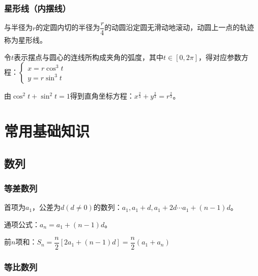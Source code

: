 \subsubsection{星形线（内摆线）}

\begin{minipage}{0.5\linewidth}
    与半径为$r$的定圆内切的半径为$\dfrac{r}{4}$的动圆沿定圆无滑动地滚动，动圆上一点的轨迹称为星形线。

    令$t$表示摆点与圆心的连线所构成夹角的弧度，其中$t\in[0,2\pi]$，得对应参数方程：$
    \left\{
    \begin{array}{lcl}
        x=r\cos^3t \\
        y=r\sin^3t
    \end{array}
    \right.
    $

    由$\cos^2t+\sin^2t=1$得到直角坐标方程：$x^{\frac{2}{3}}+y^{\frac{2}{3}}=r^{\frac{2}{3}}$。
\end{minipage}
\hfill
\begin{minipage}{0.4\linewidth}
\end{minipage}

\section{常用基础知识}
\subsection{数列}
\subsubsection{等差数列}

首项为$a_1$，公差为$d(d\neq 0)$的数列：$a_1,a_1+d,a_1+2d\cdots a_1+(n-1)d$。

通项公式：$a_n=a_1+(n-1)d$。

前$n$项和：$S_n=\dfrac{n}{2}[2a_1+(n-1)d]=\dfrac{n}{2}(a_1+a_n)$

\subsubsection{等比数列}

